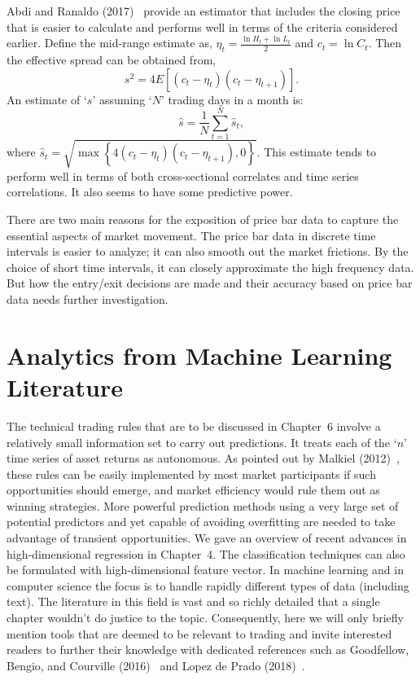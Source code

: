 Abdi and Ranaldo (2017)~\cite{abdi} provide an estimator that includes the closing price that is easier to calculate and performs well in terms of the criteria considered earlier. Define the mid-range estimate as, $\eta_t=\frac{\ln H_t + \ln L_t}{2}$ and $c_t= \ln C_t$. Then the effective spread can be obtained from,
	\begin{equation}\label{eqn:obtainedfrom}
	s^2=4 E\left[ (c_t-\eta_t) (c_t-\eta_{t+1}) \right].
	\end{equation}
An estimate of `$s$' assuming `$N$' trading days in a month is:
	\begin{equation}\label{eqn:monthlycorrected}
	\hat{s}= \dfrac{1}{N} \sum_{t=1}^N \hat{s}_t,
	\end{equation}
where $\hat{s}_t= \sqrt{ \max\left\{ 4(c_t-\eta_t)(c_t-\eta_{t+1}), 0 \right\} }$. This estimate tends to perform well in terms of both cross-sectional correlates and time series correlations. It also seems to have some predictive power. 


There are two main reasons for the exposition of price bar data to capture the essential aspects of market movement. The price bar data in discrete time intervals is easier to analyze; it can also smooth out the market frictions. By the choice of short time intervals, it can closely approximate the high frequency data. But how the entry/exit decisions are made and their accuracy based on price bar data needs further investigation. 



\section{Analytics from Machine Learning Literature\label{sec:an_mach_learn}}

The technical trading rules that are to be discussed in Chapter~6 involve a relatively small information set to carry out predictions.\label{in:machine1} It treats each of the `$n$' time series of asset returns as autonomous. As pointed out by Malkiel (2012)~\cite{malkiel}, these rules can be easily implemented by most market participants if such opportunities should emerge, and market efficiency would rule them out as winning strategies. More powerful prediction methods using a very large set of potential predictors and yet capable of avoiding overfitting are needed to take advantage of transient opportunities. We gave an overview of recent advances in high-dimensional regression in Chapter~4. The classification techniques can also be formulated with high-dimensional feature vector. In machine learning and in computer science the focus is to handle rapidly different types of data (including text). The literature in this field is vast and so richly detailed that a single chapter wouldn't do justice to the topic. Consequently, here we will only briefly mention tools that are deemed to be relevant to trading and invite interested readers to further their knowledge with dedicated references such as Goodfellow, Bengio, and Courville (2016)~\cite{goodfellow} and Lopez de Prado (2018)~\cite{LopezDePradoML}.



